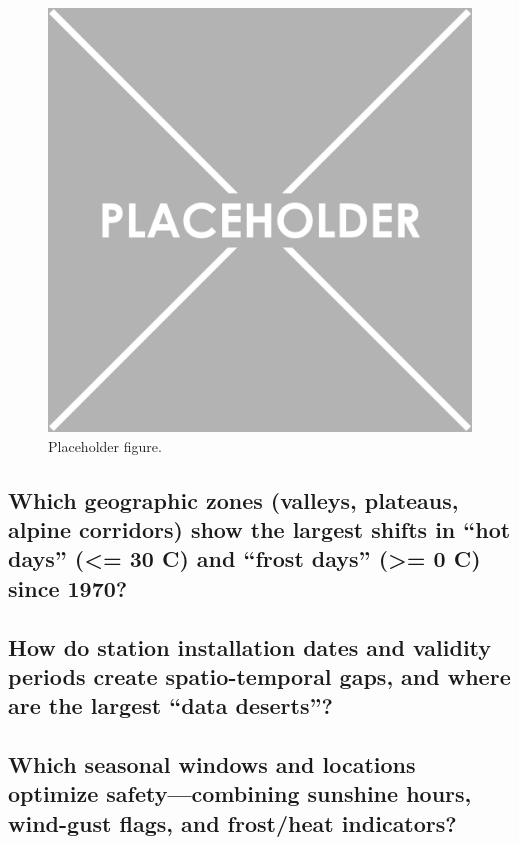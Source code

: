 \documentclass[sigconf]{acmart}
\begin{document}
\begin{figure}[H]
  \centering
  \includegraphics[width=0.4\linewidth]{img/placeholder.png}
  \caption{Placeholder figure.}
  \label{fig:placeholder}
\end{figure}


\subsection{Which geographic zones (valleys, plateaus, alpine corridors) show the largest shifts in “hot days” (<= 30 C) and “frost days” (>= 0 C) since 1970?}
\subsection{How do station installation dates and validity periods create spatio-temporal gaps, and where are the largest “data deserts”?}
\subsection{Which seasonal windows and locations optimize safety—combining sunshine hours, wind-gust flags, and frost/heat indicators?}



\end{document}
